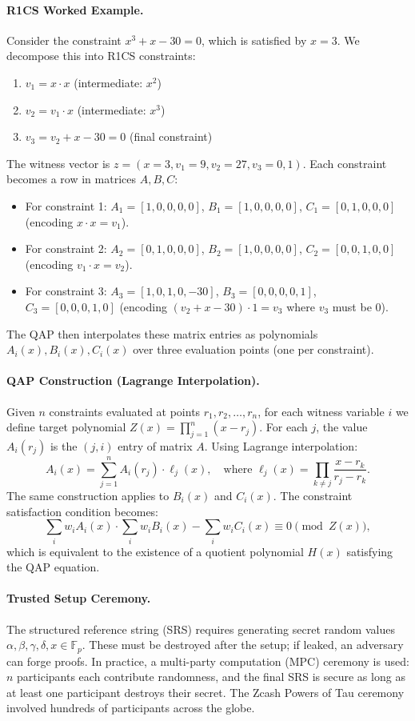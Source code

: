\paragraph{R1CS Worked Example.} Consider the constraint $x^3 + x - 30 = 0$, which is satisfied by $x=3$. We decompose this into R1CS constraints:
\begin{enumerate}
\item $v_1 = x \cdot x$ (intermediate: $x^2$)
\item $v_2 = v_1 \cdot x$ (intermediate: $x^3$)
\item $v_3 = v_2 + x - 30 = 0$ (final constraint)
\end{enumerate}
The witness vector is $z = (x=3, v_1=9, v_2=27, v_3=0, 1)$. Each constraint becomes a row in matrices $A, B, C$:
\begin{itemize}
\item For constraint 1: $A_1 = [1,0,0,0,0]$, $B_1 = [1,0,0,0,0]$, $C_1 = [0,1,0,0,0]$ (encoding $x \cdot x = v_1$).
\item For constraint 2: $A_2 = [0,1,0,0,0]$, $B_2 = [1,0,0,0,0]$, $C_2 = [0,0,1,0,0]$ (encoding $v_1 \cdot x = v_2$).
\item For constraint 3: $A_3 = [1,0,1,0,-30]$, $B_3 = [0,0,0,0,1]$, $C_3 = [0,0,0,1,0]$ (encoding $(v_2 + x - 30) \cdot 1 = v_3$ where $v_3$ must be 0).
\end{itemize}
The QAP then interpolates these matrix entries as polynomials $A_i(x), B_i(x), C_i(x)$ over three evaluation points (one per constraint).

\paragraph{QAP Construction (Lagrange Interpolation).} Given $n$ constraints evaluated at points $r_1, r_2, \dots, r_n$, for each witness variable $i$ we define target polynomial $Z(x) = \prod_{j=1}^n (x - r_j)$. For each $j$, the value $A_i(r_j)$ is the $(j,i)$ entry of matrix $A$. Using Lagrange interpolation:
\[
A_i(x) = \sum_{j=1}^n A_i(r_j) \cdot \ell_j(x), \quad \text{where } \ell_j(x) = \prod_{k \neq j} \frac{x - r_k}{r_j - r_k}.
\]
The same construction applies to $B_i(x)$ and $C_i(x)$. The constraint satisfaction condition becomes:
\[
\sum_i w_i A_i(x) \cdot \sum_i w_i B_i(x) - \sum_i w_i C_i(x) \equiv 0 \pmod{Z(x)},
\]
which is equivalent to the existence of a quotient polynomial $H(x)$ satisfying the QAP equation.

\paragraph{Trusted Setup Ceremony.} The structured reference string (SRS) requires generating secret random values $\alpha, \beta, \gamma, \delta, x \in \mathbb{F}_p$. These must be destroyed after the setup; if leaked, an adversary can forge proofs. In practice, a multi-party computation (MPC) ceremony is used: $n$ participants each contribute randomness, and the final SRS is secure as long as at least one participant destroys their secret. The Zcash Powers of Tau ceremony involved hundreds of participants across the globe.

